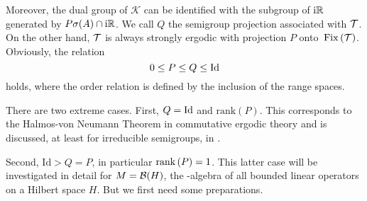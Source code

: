 Moreover, the dual group of $\mathcal{K}$ can be identified with the subgroup of $\mathrm{i}\mathbb{R}$ generated by 
$P\sigma(A) \cap \mathrm{i} \mathbb{R} $.
We call $Q$ the semigroup projection associated with $\mathcal{T}$.
On the other hand, $\mathcal{T}$ is always strongly ergodic with projection $P$ onto $\mathop{}\mathrm{Fix}\left(\mathcal{T}\right)$.
Obviously, the relation
\[
    0 \leq P \leq Q \leq \operatorname{Id} 
\]
holds, where the order relation is defined by the inclusion of the range spaces.

There are two extreme cases.
First, $Q = \operatorname{Id}$ and $ \text{rank}(P)$.
This corresponds to the Halmos-von Neumann Theorem in commutative ergodic theory and is discussed, at least for irreducible semigroups, in \citet{olesen:1980}.

Second, $\text{Id} > Q = P$, in particular $\mathop{}\!\mathrm{rank}\,(P) = 1$.
This latter case will be investigated in detail for $M = \mathcal{B}(H) $, the \WA-algebra of all bounded linear operators on a Hilbert space $H$.
But we first need some preparations.


